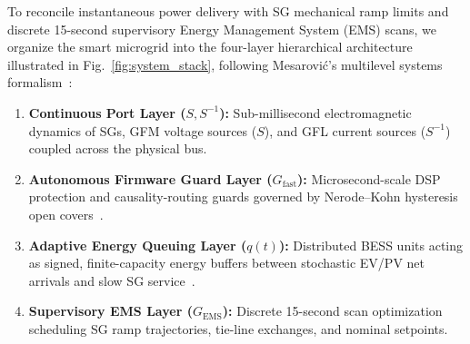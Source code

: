 \documentclass[journal]{IEEEtran}
\begin{document}
To reconcile instantaneous power delivery with SG mechanical ramp limits and discrete 15-second supervisory Energy Management System (EMS) scans, we organize the smart microgrid into the four-layer hierarchical architecture illustrated in Fig.~\ref{fig:system_stack}, following Mesarovi\'{c}'s multilevel systems formalism~\cite{Mesarovic1970}:
\begin{enumerate}
    \item \textbf{Continuous Port Layer ($S, S^{-1}$):} Sub-millisecond electromagnetic dynamics of SGs, GFM voltage sources ($S$), and GFL current sources ($S^{-1}$) coupled across the physical bus.
    \item \textbf{Autonomous Firmware Guard Layer ($G_{\mathrm{fast}}$):} Microsecond-scale DSP protection and causality-routing guards governed by Nerode--Kohn hysteresis open covers~\cite{Nerode1993}.
    \item \textbf{Adaptive Energy Queuing Layer ($q(t)$):} Distributed BESS units acting as signed, finite-capacity energy buffers between stochastic EV/PV net arrivals and slow SG service~\cite{LeBoudec2001,Gelenbe2015}.
    \item \textbf{Supervisory EMS Layer ($G_{\mathrm{EMS}}$):} Discrete 15-second scan optimization scheduling SG ramp trajectories, tie-line exchanges, and nominal setpoints.
\end{enumerate}
\end{document}
